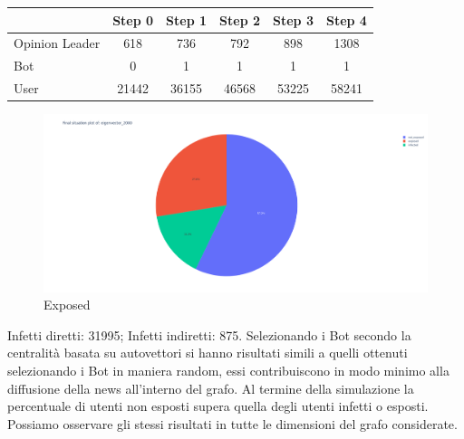         \begin{table}[H]
            \centering
            \begin{tabular}{|l|c|c|c|c|c|}
            \hline
                           & Step 0 & Step 1 & Step 2 & Step 3 & Step 4 \\ \hline
            Opinion Leader & 618    & 736    & 792    & 898    & 1308   \\ \hline
            Bot            & 0      & 1      & 1      & 1      & 1      \\ \hline
            User           & 21442  & 36155  & 46568  & 53225  & 58241  \\ \hline
            \end{tabular}
        \end{table}
                
        \begin{figure}[H]
            \includegraphics[width=16cm]{resources/charts/eig_2000_pie.png}
            \caption{Exposed}
            \label{fig:btw_2000_pie}
        \end{figure}
        Infetti diretti: 31995;\newline
        Infetti indiretti: 875.
        \newline 
        \newline
        Selezionando i Bot secondo la centralità basata su autovettori si hanno risultati simili a quelli ottenuti selezionando i Bot in maniera random, essi contribuiscono in modo minimo alla diffusione della news all’interno del grafo. Al termine della simulazione la percentuale di utenti non esposti supera quella degli utenti infetti o esposti. \newline
        Possiamo osservare gli stessi risultati in tutte le dimensioni del grafo considerate. 

    
        
        
        
                
        
        
        

